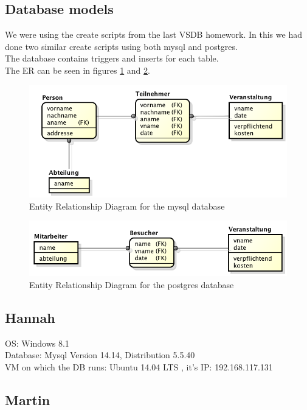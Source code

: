 \documentclass[10pt]{article}
\begin{document}
\subsection{Database models}
We were using the create scripts from the last VSDB homework. In this we had done two similar create scripts using both mysql and postgres. \\ The database contains triggers and inserts for each table.\\ The ER can be seen in figures \ref{mysqler} and \ref{pger}.
\begin{figure}[!h]
	\begin{center}
		\includegraphics[width=0.8\linewidth]{pictures/ERD_mysql}
		\caption{Entity Relationship Diagram for the mysql database}
		\label{mysqler}
	\end{center}
\end{figure}
\begin{figure}[!h]
	\begin{center}
		\includegraphics[width=0.8\linewidth]{pictures/ERD_psql}
		\caption{Entity Relationship Diagram for the postgres database}
		\label{pger}
	\end{center}
\end{figure}
\FloatBarrier
\subsection{Hannah}
OS: Windows 8.1 \\
Database: Mysql Version 14.14, Distribution 5.5.40 \\
VM on which the DB runs: Ubuntu 14.04 LTS , it's IP: 192.168.117.131
\subsection{Martin}
\newpage
\newpage
\end{document}
